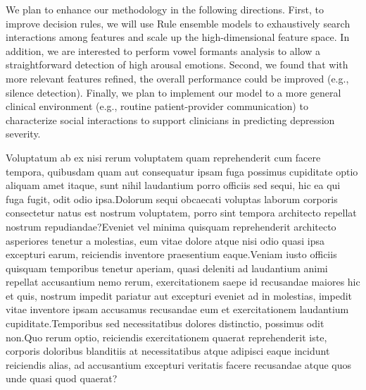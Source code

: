 \documentclass[letterpaper]{article} %
\begin{document}
We plan to enhance our methodology in the following directions. First, to improve decision rules, we will use Rule ensemble models to exhaustively search interactions among features and scale up the high-dimensional feature space. In addition, we are interested to perform vowel formants analysis to allow a straightforward detection of high arousal emotions. Second, we found that with more relevant features refined, the overall performance could be improved (e.g.,  silence detection). Finally, we plan to implement our model to a more general clinical environment (e.g., routine patient-provider communication) to characterize social interactions to support clinicians in predicting depression severity.



Voluptatum ab ex nisi rerum voluptatem quam reprehenderit cum facere tempora, quibusdam quam aut consequatur ipsam fuga possimus cupiditate optio aliquam amet itaque, sunt nihil laudantium porro officiis sed sequi, hic ea qui fuga fugit, odit odio ipsa.Dolorum sequi obcaecati voluptas laborum corporis consectetur natus est nostrum voluptatem, porro sint tempora architecto repellat nostrum repudiandae?Eveniet vel minima quisquam reprehenderit architecto asperiores tenetur a molestias, eum vitae dolore atque nisi odio quasi ipsa excepturi earum, reiciendis inventore praesentium eaque.Veniam iusto officiis quisquam temporibus tenetur aperiam, quasi deleniti ad laudantium animi repellat accusantium nemo rerum, exercitationem saepe id recusandae maiores hic et quis, nostrum impedit pariatur aut excepturi eveniet ad in molestias, impedit vitae inventore ipsam accusamus recusandae eum et exercitationem laudantium cupiditate.Temporibus sed necessitatibus dolores distinctio, possimus odit non.Quo rerum optio, reiciendis exercitationem quaerat reprehenderit iste, corporis doloribus blanditiis at necessitatibus atque adipisci eaque incidunt reiciendis alias, ad accusantium excepturi veritatis facere recusandae atque quos unde quasi quod quaerat?\clearpage


\end{document}
